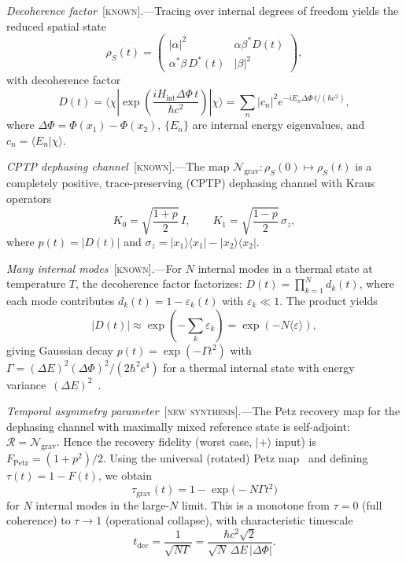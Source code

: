 \documentclass[prl,twocolumn,superscriptaddress,longbibliography,floatfix]{revtex4-2}
\newcommand{\Petz}{\mathcal{R}}
\newcommand{\chan}{\mathcal{N}}
\newcommand{\ket}[1]{|#1\rangle}
\newcommand{\bra}[1]{\langle#1|}
\newcommand{\braket}[2]{\langle#1|#2\rangle}
\newcommand{\op}[2]{|#1\rangle\langle#2|}
\newcommand{\tauasym}{\tau}
\begin{document}
\emph{Decoherence factor}~[\textsc{known}].---Tracing over internal
degrees of freedom yields the reduced spatial state
\begin{equation}
\rho_S(t) = \begin{pmatrix}
|\alpha|^2 & \alpha\beta^* D(t) \\
\alpha^*\beta\, D^*(t) & |\beta|^2
\end{pmatrix},
\label{eq:rho_S}
\end{equation}
with decoherence factor
\begin{equation}
D(t) = \bra{\chi}\exp\!\left(\frac{i H_{\mathrm{int}}
  \Delta\Phi\, t}{\hbar c^2}\right)\ket{\chi}
= \sum_n |c_n|^2 e^{-i E_n \Delta\Phi\, t/(\hbar c^2)},
\label{eq:D_factor}
\end{equation}
where $\Delta\Phi = \Phi(x_1) - \Phi(x_2)$, $\{E_n\}$ are internal
energy eigenvalues, and $c_n = \braket{E_n}{\chi}$.

\emph{CPTP dephasing channel}~[\textsc{known}].---The map
$\chan_{\mathrm{grav}}: \rho_S(0) \mapsto \rho_S(t)$ is a
completely positive, trace-preserving (CPTP) dephasing channel with
Kraus operators~\cite{Schlosshauer2007}
\begin{equation}
K_0 = \sqrt{\frac{1+p}{2}}\, I, \qquad
K_1 = \sqrt{\frac{1-p}{2}}\, \sigma_z,
\label{eq:kraus}
\end{equation}
where $p(t) = |D(t)|$ and $\sigma_z = \op{x_1}{x_1} - \op{x_2}{x_2}$.

\emph{Many internal modes}~[\textsc{known}].---For $N$ internal modes
in a thermal state at temperature $T$, the decoherence factor
factorizes:
$D(t) = \prod_{k=1}^{N} d_k(t)$, where each mode contributes
$d_k(t) = 1 - \varepsilon_k(t)$ with
$\varepsilon_k \ll 1$.  The product yields
\begin{equation}
|D(t)| \approx \exp\!\left(-\sum_k \varepsilon_k\right)
= \exp(-N\langle\varepsilon\rangle),
\label{eq:D_product}
\end{equation}
giving Gaussian decay $p(t) = \exp(-\Gamma t^2)$ with
$\Gamma = (\Delta E)^2 (\Delta\Phi)^2/(2\hbar^2 c^4)$ for a thermal
internal state with energy variance~$(\Delta E)^2$~\cite{Pikovski2015}.

\emph{Temporal asymmetry parameter}~[\textsc{new synthesis}].---The
Petz recovery map for the dephasing channel with maximally mixed
reference state is self-adjoint: $\Petz = \chan_{\mathrm{grav}}$.
Hence the recovery fidelity (worst case, $\ket{+}$ input) is
$F_{\mathrm{Petz}} = (1 + p^2)/2$.  Using the universal (rotated)
Petz map~\cite{Junge2018} and defining
$\tauasym(t) = 1 - F(t)$, we obtain
\begin{equation}
\boxed{
\tauasym_{\mathrm{grav}}(t)
= 1 - \exp\!\big(-N\Gamma t^2\big)
}
\label{eq:tau_grav}
\end{equation}
for $N$ internal modes in the large-$N$ limit.  This is a monotone
from $\tauasym = 0$ (full coherence) to $\tauasym \to 1$
(operational collapse), with characteristic timescale
\begin{equation}
t_{\mathrm{dec}} = \frac{1}{\sqrt{N\Gamma}}
= \frac{\hbar c^2 \sqrt{2}}{\sqrt{N}\,\Delta E\,|\Delta\Phi|}.
\label{eq:t_dec}
\end{equation}
\end{document}
